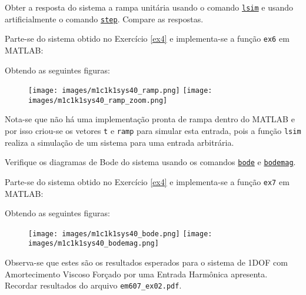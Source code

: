 \documentclass{article}
\begin{document}
\newpage\begin{exercise}\label{ex6}
    Obter a resposta do sistema a rampa unitária usando o comando \href{https://www.mathworks.com/help/control/ref/lti.lsim.html}{\texttt{lsim}} e usando artificialmente o comando \href{https://www.mathworks.com/help/control/ref/lti.step.html}{\texttt{step}}. Compare as respostas.
\end{exercise}
\begin{resolution}
    Parte-se do sistema obtido no Exercício \ref{ex4} e implementa-se a função \texttt{ex6} em MATLAB:
    \begin{scriptsize}
        \myMatlab
    \end{scriptsize}
    Obtendo as seguintes figuras:
    \begin{figure}[H]
        \centering
        \texttt{[image: images/m1c1k1sys40\_ramp.png]}
        \texttt{[image: images/m1c1k1sys40\_ramp\_zoom.png]}
    \end{figure}
    Nota-se que não há uma implementação pronta de rampa dentro do MATLAB e por isso criou-se os vetores \texttt{t} e \texttt{ramp} para simular esta entrada, pois a função \texttt{lsim} realiza a simulação de um sistema para uma entrada arbitrária.\\
\end{resolution}

\newpage\begin{exercise}\label{ex7}
    Verifique os diagramas de Bode do sistema usando os comandos \href{https://www.mathworks.com/help/control/ref/lti.bode.html}{\texttt{bode}} e \href{https://www.mathworks.com/help/ident/ref/lti.bodemag.html}{\texttt{bodemag}}.
\end{exercise}
\begin{resolution}
    Parte-se do sistema obtido no Exercício \ref{ex4} e implementa-se a função \texttt{ex7} em MATLAB:
    \begin{scriptsize}
        \myMatlab
    \end{scriptsize}
    Obtendo as seguintes figuras:
    \begin{figure}[H]
        \centering
        \texttt{[image: images/m1c1k1sys40\_bode.png]}
        \texttt{[image: images/m1c1k1sys40\_bodemag.png]}
    \end{figure}
    Observa-se que estes são os resultados esperados para o sistema de 1DOF com Amortecimento Viscoso Forçado por uma Entrada Harmônica apresenta. Recordar resultados do arquivo \texttt{em607\_ex02.pdf}.
\end{resolution}
\end{document}
